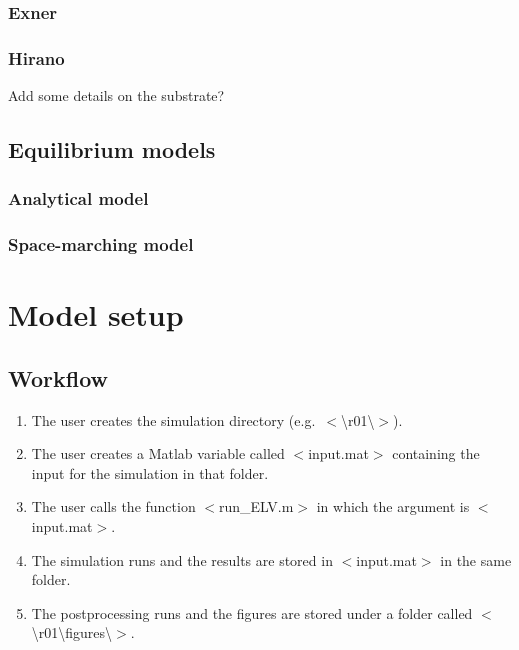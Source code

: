 \documentclass[a4paper, 11pt]{article}
\newcommand{\pathfile}[1]{$<$#1$>$}
\newcommand{\pathdir}[1]{$<$\textbackslash#1\textbackslash$>$}
\begin{document}
\subsubsection{Exner}
\subsubsection{Hirano}
Add some details on the substrate?

\subsection{Equilibrium models}
\subsubsection{Analytical model}
\subsubsection{Space-marching model}

\clearpage












































\section{Model setup}

\subsection{Workflow}
%
%

\begin{enumerate}
\item The user creates the simulation directory (e.g.\ \pathdir{r01}). 
\item The user creates a Matlab variable called \pathfile{input.mat} containing the input for the simulation in that folder.
\item The user calls the function \pathfile{run\_ELV.m} in which the argument is \pathfile{input.mat}.
\item The simulation runs and the results are stored in \pathfile{input.mat} in the same folder.
\item The postprocessing runs and the figures are stored under a folder called \pathdir{r01\textbackslash figures}.
\end{enumerate}
\end{document}

